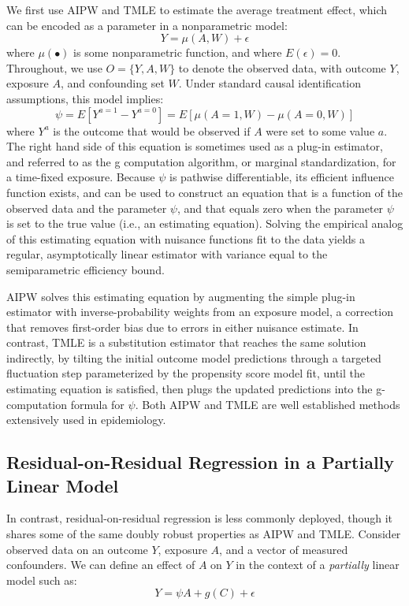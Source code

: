 \documentclass[12pt]{article}
\begin{document}
We first use AIPW and TMLE to estimate the average treatment effect, which can be encoded as a parameter in a nonparametric model:
\begin{equation}
Y = \mu(A, W) + \epsilon \label{eqn:nonpar}
\end{equation}
where $\mu(\bullet)$ is some nonparametric function, and where $E(\epsilon) = 0$. Throughout, we use $O = \{Y, A, W\}$ to denote the observed data, with outcome $Y$, exposure $A$, and confounding set $W$. Under standard causal identification assumptions,\cite{Naimi2023a} this model implies:
$$\psi = E[Y^{a = 1} - Y^{a = 0}] = E[\mu(A = 1, W) - \mu(A = 0, W)]$$
where $Y^{a}$ is the outcome that would be observed if $A$ were set to some value $a$. The right hand side of this equation is sometimes used as a plug-in estimator, and referred to as the g computation algorithm,\cite{Robins1986} or marginal standardization,\cite{Naimi2020,Muller2014} for a time-fixed exposure. Because $\psi$ is pathwise differentiable, its efficient influence function exists, and can be used to construct an equation that is a function of the observed data and the parameter $\psi$, and that equals zero when the parameter $\psi$ is set to the true value (i.e., an estimating equation).\cite{Ross2024} Solving the empirical analog of this estimating equation with nuisance functions fit to the data yields a regular, asymptotically linear estimator with variance equal to the semiparametric efficiency bound.\cite{Kennedy2024}

AIPW solves this estimating equation by augmenting the simple plug-in estimator with inverse-probability weights from an exposure model, a correction that removes first-order bias due to errors in either nuisance estimate.\cite{Kennedy2024} In contrast, TMLE is a substitution estimator that reaches the same solution indirectly, by tilting the initial outcome model predictions through a targeted fluctuation step parameterized by the propensity score model fit, until the estimating equation is satisfied, then plugs the updated predictions into the g-computation formula for $\psi$.\cite{Luque-Fernandez2018} Both AIPW and TMLE are well established methods extensively used in epidemiology.

\subsection{Residual-on-Residual Regression in a Partially Linear Model}

In contrast, residual-on-residual regression is less commonly deployed, though it shares some of the same doubly robust properties as AIPW and TMLE. Consider observed data on an outcome $Y$, exposure $A$, and a vector of measured confounders. We can define an effect of $A$ on $Y$ in the context of a \emph{partially} linear model such as:
\begin{equation}
Y = \psi A + g(C) + \epsilon \label{eqn:plm}
\end{equation}
\end{document}
